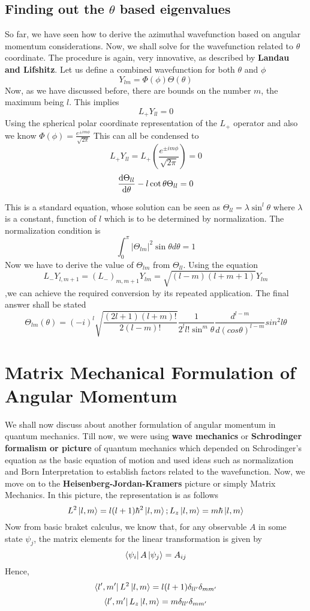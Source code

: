\documentclass[12pt]{article}
\begin{document}
\subsection{Finding out the $\theta$ based eigenvalues}
So far, we have seen how to derive the azimuthal wavefunction based on angular momentum considerations. Now, we shall solve for the wavefunction related to $\theta$ coordinate. The procedure is again, very innovative, as described by \textbf{Landau and Lifshitz}. Let us define a combined wavefunction for both $\theta$ and $\phi$ $$Y_{lm} = \Phi(\phi)\Theta(\theta)$$ Now, as we have discussed before, there are bounds on the number $m$, the maximum being $l$. This implies $$L_+Y_{ll} = 0$$ Using the spherical polar coordinate representation of the $L_+$ operator and also we know $\Phi(\phi) = \frac{e^{\pm im\phi}}{\sqrt {2\pi}}$ This can all be condensed to 
$$L_+Y_{ll} = L_+(\frac{e^{\pm im\phi}}{\sqrt {2\pi}}) = 0$$
$$\frac{\mathrm{d}{\Theta_{ll}}}{\mathrm{d}{\theta}} - l\cot{\theta}\Theta_{ll} = 0$$

This is a standard equation, whose solution can be seen as $\Theta_{ll} = \lambda\sin^l\theta$ where $\lambda$ is a constant, function of $l$ which is to be determined by normalization. The normalization condition is 
$$\int_0^\pi |\Theta_{lm}|^2\sin\theta d\theta = 1$$
Now we have to derive the value of $\Theta_{lm}$ from $\Theta_{ll}$. Using the equation $$L_-Y_{l,m+1} = (L_-)_{m,m+1}Y_{lm} = \sqrt{(l-m)(l+m+1)}Y_{lm}$$,we can achieve the required conversion by its repeated application.
The final answer shall be stated
$$\Theta_{lm}(\theta) = (-i)^l\sqrt{\frac{(2l+1)(l+m)!}{2(l-m)!}}\frac{1}{2^ll!\sin^m\theta}\frac{d^{l-m}}{d(cos\theta)^{l-m}}sin^2l\theta$$

\section{Matrix Mechanical Formulation of Angular Momentum}
We shall now discuss about another formulation of angular momentum in quantum mechanics. Till now, we were using \textbf{wave mechanics} or \textbf{Schrodinger formalism or picture} of quantum mechanics which depended on Schrodinger's equation as the basic equation of motion and used ideas such as normalization and Born Interpretation to establish factors related to the wavefunction. Now, we move on to the \textbf{Heisenberg-Jordan-Kramers} picture or simply Matrix Mechanics. In this picture, the representation is as follows
$$L^2\Ket{l,m} = l(l+1)\hbar^2\Ket{l,m};  L_z\Ket{l,m} = m\hbar\Ket{l,m}$$
Now from basic braket calculus, we know that, for any observable $A$ in some state $\psi_j$, the matrix elements for the linear transformation is given by
$$\Bra{\psi_i}A\Ket{\psi_j} = A_{ij}$$ Hence,
$$\Bra{l',m'}L^2\Ket{l,m} = l(l+1)\delta_{ll'}\delta_{mm'}$$
$$\Bra{l',m'}L_z\Ket{l,m} = m\delta_{ll'}\delta_{mm'}$$
\end{document}
